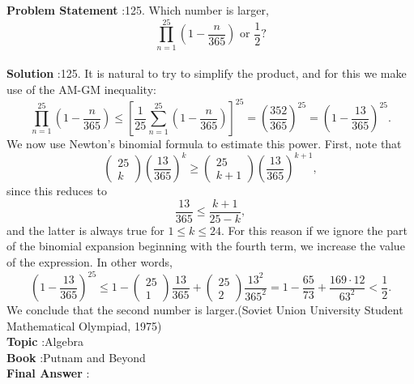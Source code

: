\documentclass[10pt]{article}
\begin{document}
\textbf{Problem Statement} :125. Which number is larger,$$ \prod_{n=1}^{25}\left(1-\frac{n}{365}\right) \text { or } \frac{1}{2} ? $$\\
\textbf{Solution} :125. It is natural to try to simplify the product, and for this we make use of the AM-GM inequality:$$ \prod_{n=1}^{25}\left(1-\frac{n}{365}\right) \leq\left[\frac{1}{25} \sum_{n=1}^{25}\left(1-\frac{n}{365}\right)\right]^{25}=\left(\frac{352}{365}\right)^{25}=\left(1-\frac{13}{365}\right)^{25} . $$We now use Newton's binomial formula to estimate this power. First, note that$$ \left(\begin{array}{c} 25 \\ k \end{array}\right)\left(\frac{13}{365}\right)^{k} \geq\left(\begin{array}{c} 25 \\ k+1 \end{array}\right)\left(\frac{13}{365}\right)^{k+1}, $$since this reduces to$$ \frac{13}{365} \leq \frac{k+1}{25-k}, $$and the latter is always true for $1 \leq k \leq 24$. For this reason if we ignore the part of the binomial expansion beginning with the fourth term, we increase the value of the expression. In other words,$$ \left(1-\frac{13}{365}\right)^{25} \leq 1-\left(\begin{array}{c} 25 \\ 1 \end{array}\right) \frac{13}{365}+\left(\begin{array}{c} 25 \\ 2 \end{array}\right) \frac{13^{2}}{365^{2}}=1-\frac{65}{73}+\frac{169 \cdot 12}{63^{2}}<\frac{1}{2} . $$We conclude that the second number is larger.(Soviet Union University Student Mathematical Olympiad, 1975) \\
\textbf{Topic} :Algebra\\
\textbf{Book} :Putnam and Beyond\\
\textbf{Final Answer} :\\
\end{document}
